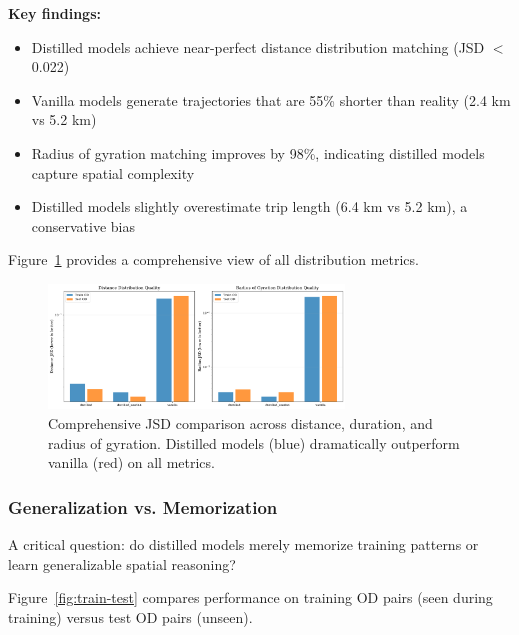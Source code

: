 \textbf{Key findings:}
\begin{itemize}[noitemsep,topsep=0pt]
\item Distilled models achieve near-perfect distance distribution matching (JSD $<$ 0.022)
\item Vanilla models generate trajectories that are 55\% shorter than reality (2.4 km vs 5.2 km)
\item Radius of gyration matching improves by 98\%, indicating distilled models capture spatial complexity
\item Distilled models slightly overestimate trip length (6.4 km vs 5.2 km), a conservative bias
\end{itemize}

Figure~\ref{fig:jsd-comparison} provides a comprehensive view of all distribution metrics.

\begin{figure}[h]
\centering
\includegraphics[width=0.7\textwidth]{assets/plots/hoser/jsd_comparison.pdf}
\caption{Comprehensive JSD comparison across distance, duration, and radius of gyration. Distilled models (blue) dramatically outperform vanilla (red) on all metrics.}
\label{fig:jsd-comparison}
\end{figure}

\subsubsection{Generalization vs. Memorization}

A critical question: do distilled models merely memorize training patterns or learn generalizable spatial reasoning?

Figure~\ref{fig:train-test} compares performance on training OD pairs (seen during training) versus test OD pairs (unseen).

